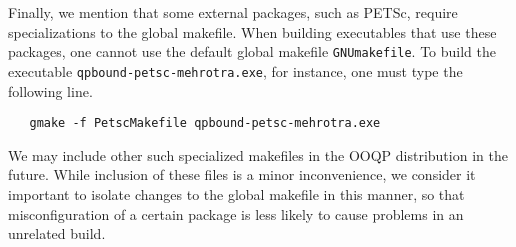 Finally, we mention that some external packages, such as PETSc,
require specializations to the global makefile. When building
executables that use these packages, one cannot use the default global
makefile {\tt GNUmakefile}. To build the executable
\verb|qpbound-petsc-mehrotra.exe|, for instance, one must type the
following line.
\begin{verbatim}
   gmake -f PetscMakefile qpbound-petsc-mehrotra.exe
\end{verbatim}
We may include other such specialized makefiles in the OOQP
distribution in the future. While inclusion of these files is a minor
inconvenience, we consider it important to isolate changes to the
global makefile in this manner, so that misconfiguration of a certain
package is less likely to cause problems in an unrelated build.

